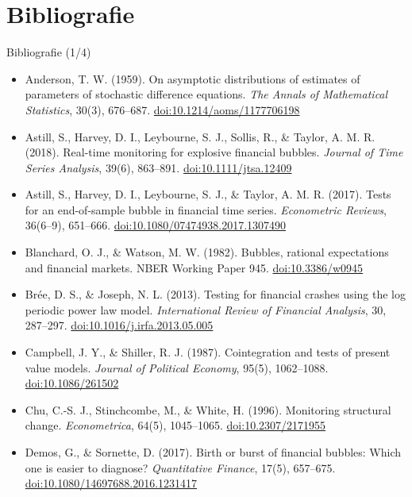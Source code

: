\section{Bibliografie}

\begin{frame}{Bibliografie (1/4)}
\itemsize{\tiny}
\begin{itemize}
    \item Anderson, T. W. (1959). On asymptotic distributions of estimates of parameters of stochastic difference equations. \textit{The Annals of Mathematical Statistics}, 30(3), 676--687. \href{https://doi.org/10.1214/aoms/1177706198}{doi:10.1214/aoms/1177706198}
    \item Astill, S., Harvey, D. I., Leybourne, S. J., Sollis, R., \& Taylor, A. M. R. (2018). Real-time monitoring for explosive financial bubbles. \textit{Journal of Time Series Analysis}, 39(6), 863--891. \href{https://doi.org/10.1111/jtsa.12409}{doi:10.1111/jtsa.12409}
    \item Astill, S., Harvey, D. I., Leybourne, S. J., \& Taylor, A. M. R. (2017). Tests for an end-of-sample bubble in financial time series. \textit{Econometric Reviews}, 36(6--9), 651--666. \href{https://doi.org/10.1080/07474938.2017.1307490}{doi:10.1080/07474938.2017.1307490}
    \item Blanchard, O. J., \& Watson, M. W. (1982). Bubbles, rational expectations and financial markets. NBER Working Paper 945. \href{https://doi.org/10.3386/w0945}{doi:10.3386/w0945}
    \item Brée, D. S., \& Joseph, N. L. (2013). Testing for financial crashes using the log periodic power law model. \textit{International Review of Financial Analysis}, 30, 287--297. \href{https://doi.org/10.1016/j.irfa.2013.05.005}{doi:10.1016/j.irfa.2013.05.005}
    \item Campbell, J. Y., \& Shiller, R. J. (1987). Cointegration and tests of present value models. \textit{Journal of Political Economy}, 95(5), 1062--1088. \href{https://doi.org/10.1086/261502}{doi:10.1086/261502}
    \item Chu, C.-S. J., Stinchcombe, M., \& White, H. (1996). Monitoring structural change. \textit{Econometrica}, 64(5), 1045--1065. \href{https://doi.org/10.2307/2171955}{doi:10.2307/2171955}
    \item Demos, G., \& Sornette, D. (2017). Birth or burst of financial bubbles: Which one is easier to diagnose? \textit{Quantitative Finance}, 17(5), 657--675. \href{https://doi.org/10.1080/14697688.2016.1231417}{doi:10.1080/14697688.2016.1231417}

\end{itemize}
\end{frame}
